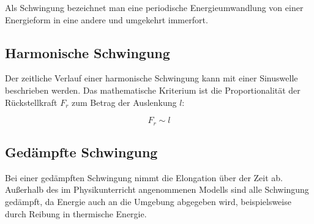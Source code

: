 Als Schwingung bezeichnet man eine periodische Energieumwandlung von einer Energieform in eine andere und umgekehrt immerfort.

\subsection{Harmonische Schwingung}

Der zeitliche Verlauf einer harmonische Schwingung kann mit einer Sinuswelle beschrieben werden. Das mathematische Kriterium ist die Proportionalität der Rückstellkraft $F_{r}$ zum Betrag der Auslenkung $l$:

\begin{equation} \label{eq:kriterium_harmonisch}
	F_{r} \sim l
\end{equation}


\subsection{Gedämpfte Schwingung}

Bei einer gedämpften Schwingung nimmt die Elongation über der Zeit ab. Außerhalb des im Physikunterricht angenommenen Modells sind alle Schwingung gedämpft, da Energie auch an die Umgebung abgegeben wird, beispielsweise durch Reibung in thermische Energie.

